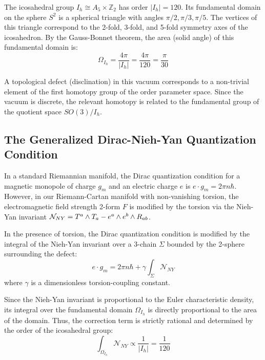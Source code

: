 \begin{definition}
The icosahedral group $I_h \cong A_5 \times \mathbb{Z}_2$ has order $|I_h| = 120$. Its fundamental domain on the sphere $S^2$ is a spherical triangle with angles $\pi/2, \pi/3, \pi/5$. The vertices of this triangle correspond to the 2-fold, 3-fold, and 5-fold symmetry axes of the icosahedron. By the Gauss-Bonnet theorem, the area (solid angle) of this fundamental domain is:
\begin{equation}
    \Omega_{I_h} = \frac{4\pi}{|I_h|} = \frac{4\pi}{120} = \frac{\pi}{30}
\end{equation}
\end{definition}

A topological defect (disclination) in this vacuum corresponds to a non-trivial element of the first homotopy group of the order parameter space. Since the vacuum is discrete, the relevant homotopy is related to the fundamental group of the quotient space $SO(3)/I_h$.

\subsection{The Generalized Dirac-Nieh-Yan Quantization Condition}

In a standard Riemannian manifold, the Dirac quantization condition for a magnetic monopole of charge $g_m$ and an electric charge $e$ is $e \cdot g_m = 2\pi n \hbar$. However, in our Riemann-Cartan manifold with non-vanishing torsion, the electromagnetic field strength 2-form $F$ is modified by the torsion via the Nieh-Yan invariant $\mathcal{N}_{NY} = T^a \wedge T_a - e^a \wedge e^b \wedge R_{ab}$.

\begin{postulate}
In the presence of torsion, the Dirac quantization condition is modified by the integral of the Nieh-Yan invariant over a 3-chain $\Sigma$ bounded by the 2-sphere surrounding the defect:
\begin{equation}
    e \cdot g_m = 2\pi n \hbar + \gamma \int_{\Sigma} \mathcal{N}_{NY}
\end{equation}
where $\gamma$ is a dimensionless torsion-coupling constant.
\end{postulate}

Since the Nieh-Yan invariant is proportional to the Euler characteristic density, its integral over the fundamental domain $\Omega_{I_h}$ is directly proportional to the area of the domain. Thus, the correction term is strictly rational and determined by the order of the icosahedral group:
\begin{equation}
    \int_{\Omega_{I_h}} \mathcal{N}_{NY} \propto \frac{1}{|I_h|} = \frac{1}{120}
\end{equation}

